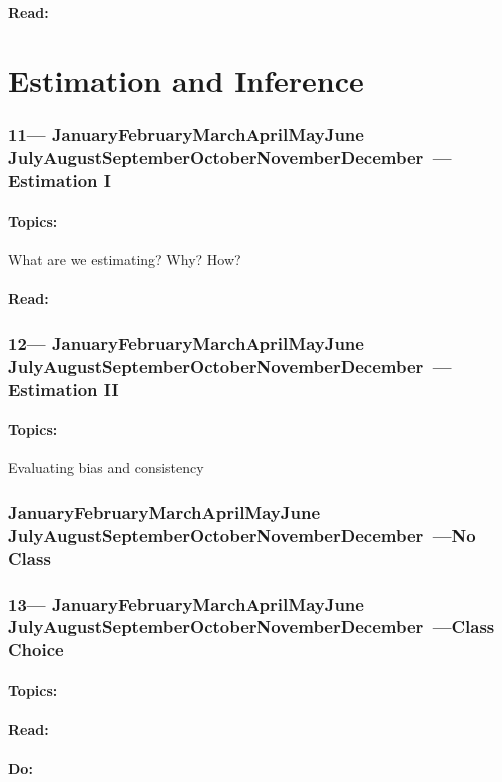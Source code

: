 \documentclass[10pt]{article}
\def\themonth{\ifcase\month\or
	January\or February\or March\or April\or May\or June\or
	July\or August\or September\or October\or November\or December\fi}
\begin{document}
\subsection{Read:}

\part{Estimation and Inference}

\AdvanceDate[7]

\section{11---\themonth~\the\day---Estimation I}

\subsection{Topics:} What are we estimating? Why? How?
\subsection{Read:}

\AdvanceDate[7]
\section{12---\themonth~\the\day---Estimation II}

\subsection{Topics:} Evaluating bias and consistency

\AdvanceDate[7]
\section{\themonth~\the\day---No Class}

\AdvanceDate[7]
\section{13---\themonth~\the\day---Class Choice}
\subsection{Topics:}
\subsection{Read:}
\subsection{Do:}
\end{document}

